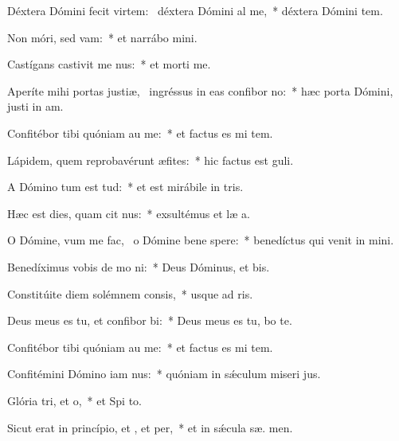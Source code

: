 \item Déxtera Dómini fecit virtem:~\pscross{} déxtera Dómini al me,~* déxtera Dómini  tem.
\item Non móri, sed vam:~* et narrábo  mini.
\item Castígans castivit me nus:~* et morti   me.
\item Aperíte mihi portas justiæ,~\pscross{} ingréssus in eas confibor no:~* hæc porta Dómini, justi in  am.
\item Confitébor tibi quóniam au me:~* et factus es mi  tem.
\item Lápidem, quem reprobavérunt æfites:~* hic factus est   guli.
\item A Dómino tum est tud:~* et est mirábile in  tris.
\item Hæc est dies, quam cit nus:~* exsultémus et læ  a.
\item O Dómine, vum me fac,~\pscross{} o Dómine bene spere:~* benedíctus qui venit in  mini.
\item Benedíximus vobis de mo ni:~* Deus Dóminus, et  bis.
\item Constitúite diem solémnem  consis,~* usque ad  ris.
\item Deus meus es tu, et confibor bi:~* Deus meus es tu,  bo te.
\item Confitébor tibi quóniam au me:~* et factus es mi  tem.
\item Confitémini Dómino iam nus:~* quóniam in sǽculum miseri jus.
\item Glória tri, et o,~* et Spi to.
\item Sicut erat in princípio, et , et per,~* et in sǽcula sæ. men.
